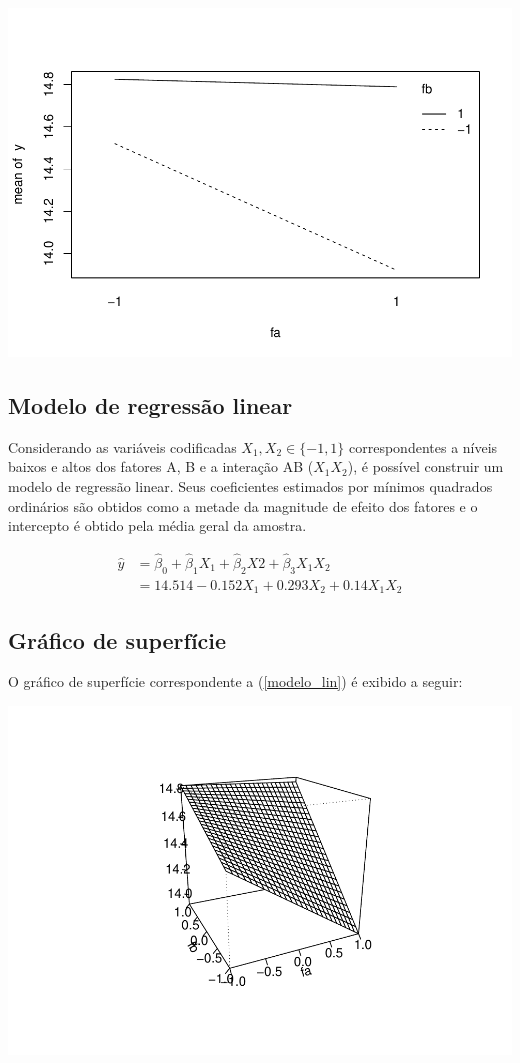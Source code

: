 \documentclass[
]{article}
\begin{document}
\begin{center}\includegraphics[width=0.6\linewidth]{lista9_files/figure-latex/graf-interacao2-1} \end{center}

\hypertarget{modelo-de-regressuxe3o-linear}{%
\subsection{Modelo de regressão
linear}\label{modelo-de-regressuxe3o-linear}}

Considerando as variáveis codificadas \(X_1, X_2 \in \{-1, 1\}\)
correspondentes a níveis baixos e altos dos fatores A, B e a interação
AB (\(X_1X_2\)), é possível construir um modelo de regressão linear.
Seus coeficientes estimados por mínimos quadrados ordinários são obtidos
como a metade da magnitude de efeito dos fatores e o intercepto é obtido
pela média geral da amostra.

\begin{align}
  \hat{y} &= \hat{\beta}_0 + \hat{\beta}_1 X_1 + \hat{\beta}_2 X2 + \hat{\beta}_3 X_1X_2 \nonumber \\
   &= 14.514 - 0.152 X_1 + 0.293 X_2 +  0.14 X_1X_2 \label{modelo_lin}
\end{align}

\hypertarget{gruxe1fico-de-superfuxedcie}{%
\subsection{Gráfico de superfície}\label{gruxe1fico-de-superfuxedcie}}

O gráfico de superfície correspondente a (\ref{modelo_lin}) é exibido a
seguir:

\begin{center}\includegraphics[width=0.75\linewidth]{lista9_files/figure-latex/superficie-1} \end{center}
\end{document}
